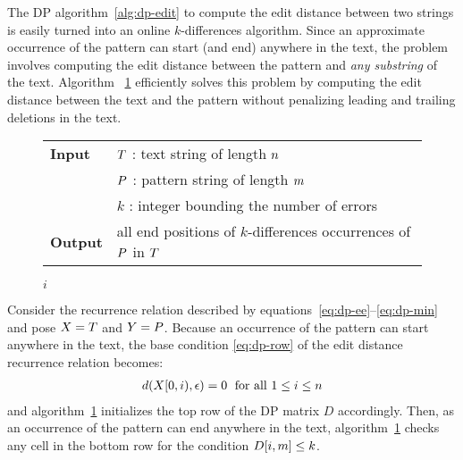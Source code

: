 The DP algorithm~\ref{alg:dp-edit} to compute the edit distance between two strings is easily turned into an online $k$-differences algorithm.
Since an approximate occurrence of the pattern can start (and end) anywhere in the text, the problem involves computing the edit distance between the pattern and \emph{any substring} of the text.
Algorithm ~\ref{alg:dp-kdiff} efficiently solves this problem by computing the edit distance between the text and the pattern without penalizing leading and trailing deletions in the text.

\begin{figure*}[b]
\begin{center}
\begin{minipage}[t]{.9\textwidth}
\begin{algorithm}[H]
\begin{tabular}{ll}
\textbf{Input}  & $T$ : text string of length $n$\\
				& $P$ : pattern string of length $m$\\
				& $k$ : integer bounding the number of errors\\
\textbf{Output} & all end positions of $k$-differences occurrences of $P$ in $T$\\
\end{tabular}
\begin{algorithmic}[1]
\EndFor
{}
	\EndFor
		\State \Report $i$
	\EndIf
\EndFor
\end{algorithmic}
\label{alg:dp-kdiff}
\end{algorithm}
\end{minipage}
\end{center}
\end{figure*}

Consider the recurrence relation described by equations~\ref{eq:dp-ee}--\ref{eq:dp-min} and pose $X=T$ and $Y=P$.
Because an occurrence of the pattern can start anywhere in the text, the base condition \ref{eq:dp-row} of the edit distance recurrence relation becomes:
\begin{eqnarray}
d(X[0,i), \epsilon) = 0 \; \text{ for all } 1 \leq i \leq n\label{eq:dp-row-kdiff}
\end{eqnarray}
and algorithm~\ref{alg:dp-kdiff} initializes the top row of the DP matrix $D$ accordingly.
Then, as an occurrence of the pattern can end anywhere in the text, algorithm~\ref{alg:dp-kdiff} checks any cell in the bottom row for the condition $D[i,m] \leq k$.

